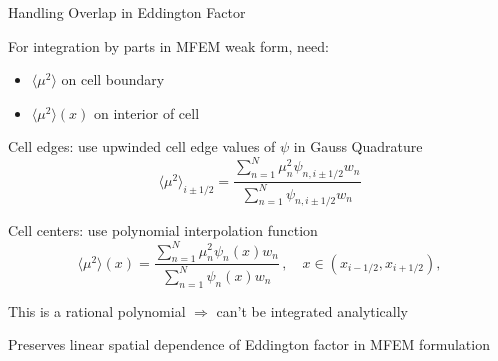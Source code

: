 \documentclass[10pt]{beamer}
\newcommand{\edd}{\langle \mu^2 \rangle}
\begin{document}
\begin{frame}{Handling Overlap in Eddington Factor}

	For integration by parts in MFEM weak form, need:
	\begin{itemize}
		\item $\edd$ on cell boundary 
		\item $\edd(x)$ on interior of cell 
	\end{itemize}

	Cell edges: use upwinded cell edge values of $\psi$ in Gauss Quadrature 
	\begin{equation*} \label{lldg:edde}
		\edd_{i\pm 1/2} = \frac{
			\sum_{n=1}^N \mu_n^2 \psi_{n,i\pm 1/2} w_n
		}{
			\sum_{n=1}^N \psi_{n,i\pm 1/2} w_n 
		} 
	\end{equation*}

	Cell centers: use polynomial interpolation function 
	\begin{equation*} \label{lldg:eddi}
			\edd(x) = \frac{
				\sum_{n=1}^N \mu_n^2 \psi_{n}(x) w_n
			}{
				\sum_{n=1}^N \psi_{n}(x) w_n 
			} \,, \quad x\in(x_{i-1/2},x_{i+1/2}),
		\end{equation*}

	This is a rational polynomial $\Rightarrow$ can't be integrated analytically 

	Preserves linear spatial dependence of Eddington factor in MFEM formulation 

\end{frame}
\end{document}
